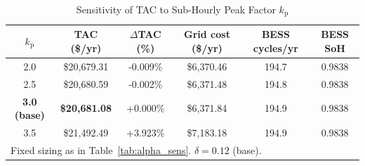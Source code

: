 \begin{table}[!t]
\caption{Sensitivity of TAC to Sub-Hourly Peak Factor $k_{\mathrm{p}}$}
\label{tab:kp_sens}
\centering
\setlength{\tabcolsep}{3pt}
\begin{tabular}{cccccc}
\toprule
$k_{\mathrm{p}}$ & \textbf{TAC (\$/yr)} & $\Delta$TAC (\%) & \textbf{Grid cost (\$/yr)} & \textbf{BESS cycles/yr} & \textbf{BESS SoH} \\
\midrule
2.0 & \$20,679.31 & -0.009\% & \$6,370.46 & 194.7 & 0.9838 \\
2.5 & \$20,680.59 & -0.002\% & \$6,371.48 & 194.8 & 0.9838 \\
\textbf{3.0 (base)} & \textbf{\$20,681.08} & +0.000\% & \$6,371.84 & 194.9 & 0.9838 \\
3.5 & \$21,492.49 & +3.923\% & \$7,183.18 & 194.9 & 0.9838 \\
\bottomrule
\multicolumn{6}{l}{\footnotesize Fixed sizing as in Table~\ref{tab:alpha_sens}. $\delta=0.12$ (base).} \\
\end{tabular}
\end{table}